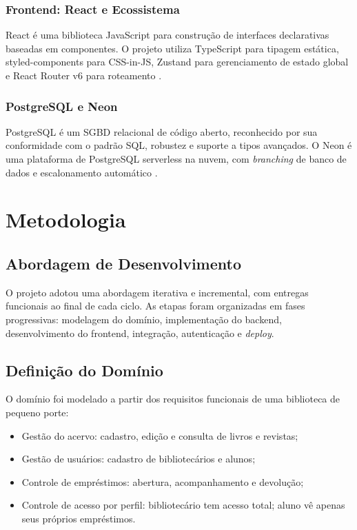 \documentclass[
  12pt,
  a4paper,
  oneside,
  brazil
]{abntex2}
\begin{document}
\subsection{Frontend: React e Ecossistema}

React é uma biblioteca JavaScript para construção de interfaces declarativas baseadas em componentes. O projeto utiliza TypeScript para tipagem estática, styled-components para CSS-in-JS, Zustand para gerenciamento de estado global e React Router v6 para roteamento \cite{facebook2024}.

\subsection{PostgreSQL e Neon}

PostgreSQL é um SGBD relacional de código aberto, reconhecido por sua conformidade com o padrão SQL, robustez e suporte a tipos avançados. O Neon é uma plataforma de PostgreSQL serverless na nuvem, com \textit{branching} de banco de dados e escalonamento automático \cite{postgresql2024}.

\chapter{Metodologia}
\label{cap:metodologia}

\section{Abordagem de Desenvolvimento}

O projeto adotou uma abordagem iterativa e incremental, com entregas funcionais ao final de cada ciclo. As etapas foram organizadas em fases progressivas: modelagem do domínio, implementação do backend, desenvolvimento do frontend, integração, autenticação e \textit{deploy}.

\section{Definição do Domínio}

O domínio foi modelado a partir dos requisitos funcionais de uma biblioteca de pequeno porte:

\begin{itemize}
  \item Gestão do acervo: cadastro, edição e consulta de livros e revistas;
  \item Gestão de usuários: cadastro de bibliotecários e alunos;
  \item Controle de empréstimos: abertura, acompanhamento e devolução;
  \item Controle de acesso por perfil: bibliotecário tem acesso total; aluno vê apenas seus próprios empréstimos.
\end{itemize}
\end{document}
